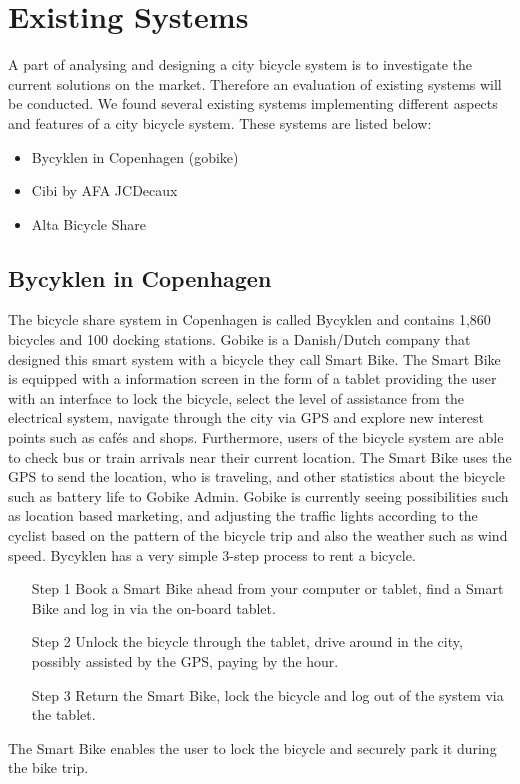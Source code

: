 \section{Existing Systems}
A part of analysing and designing a city bicycle system is to investigate the current solutions on the market. 
Therefore an evaluation of existing systems will be conducted.
We found several existing systems implementing different aspects and features of a city bicycle system. 
These systems are listed below:
\begin{itemize}
\item Bycyklen in Copenhagen (gobike)
\item Cibi by AFA JCDecaux
\item Alta Bicycle Share
\end{itemize}
\subsection{Bycyklen in Copenhagen}
The bicycle share system in Copenhagen is called Bycyklen and contains 1,860 bicycles and 100 docking stations. 
Gobike is a Danish/Dutch company that designed this smart system with a bicycle they call Smart Bike. 
The Smart Bike is equipped with a information screen in the form of a tablet providing the user with an interface to lock the bicycle, select the level of assistance from the electrical system, navigate through the city via GPS and explore new interest points such as cafés and shops.
Furthermore, users of the bicycle system are able to check bus or train arrivals near their current location.
The Smart Bike uses the GPS to send the location, who is traveling, and other statistics about the bicycle such as battery life to Gobike Admin.
Gobike is currently seeing possibilities such as location based marketing, and adjusting the traffic lights according to the cyclist based on the pattern of the bicycle trip and also the weather such as wind speed.
Bycyklen has a very simple 3-step process to rent a bicycle.
\begin{itemize}
\item[Step 1] Book a Smart Bike ahead from your computer or tablet, find a Smart Bike and log in via the on-board tablet.
\item[Step 2] Unlock the bicycle through the tablet, drive around in the city, possibly assisted by the GPS, paying by the hour.
\item[Step 3] Return the Smart Bike, lock the bicycle and log out of the system via the tablet.
\end{itemize}
The Smart Bike enables the user to lock the bicycle and securely park it during the bike trip.

